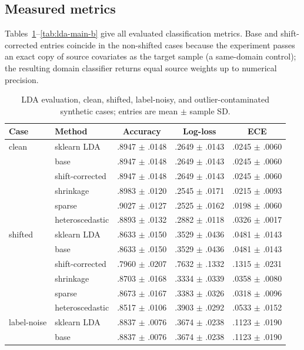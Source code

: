 \documentclass[conference]{IEEEtran}
\begin{document}
\subsection{Measured metrics}
Tables~\ref{tab:lda-main-a}--\ref{tab:lda-main-b} give all evaluated classification metrics. Base and shift-corrected entries coincide in the non-shifted cases because the experiment passes an exact copy of source covariates as the target sample (a same-domain control); the resulting domain classifier returns equal source weights up to numerical precision.
\begin{table}[t]
\centering\scriptsize
\setlength{\tabcolsep}{3pt}
\caption{LDA evaluation, clean, shifted, label-noisy, and outlier-contaminated synthetic cases; entries are mean $\pm$ sample SD.}
\label{tab:lda-main-a}
\begin{tabular}{llccc}
\toprule
Case & Method & Accuracy & Log-loss & ECE \\
\midrule
clean & sklearn LDA & .8947 $\pm$ .0148 & .2649 $\pm$ .0143 & .0245 $\pm$ .0060 \\
 & base & .8947 $\pm$ .0148 & .2649 $\pm$ .0143 & .0245 $\pm$ .0060 \\
 & shift-corrected & .8947 $\pm$ .0148 & .2649 $\pm$ .0143 & .0245 $\pm$ .0060 \\
 & shrinkage & .8983 $\pm$ .0120 & .2545 $\pm$ .0171 & .0215 $\pm$ .0093 \\
 & sparse & .9027 $\pm$ .0127 & .2525 $\pm$ .0162 & .0198 $\pm$ .0060 \\
 & heteroscedastic & .8893 $\pm$ .0132 & .2882 $\pm$ .0118 & .0326 $\pm$ .0017 \\
\midrule
shifted & sklearn LDA & .8633 $\pm$ .0150 & .3529 $\pm$ .0436 & .0481 $\pm$ .0143 \\
 & base & .8633 $\pm$ .0150 & .3529 $\pm$ .0436 & .0481 $\pm$ .0143 \\
 & shift-corrected & .7960 $\pm$ .0207 & .7632 $\pm$ .1332 & .1315 $\pm$ .0231 \\
 & shrinkage & .8703 $\pm$ .0168 & .3334 $\pm$ .0339 & .0358 $\pm$ .0080 \\
 & sparse & .8673 $\pm$ .0167 & .3383 $\pm$ .0326 & .0318 $\pm$ .0096 \\
 & heteroscedastic & .8517 $\pm$ .0106 & .3903 $\pm$ .0292 & .0533 $\pm$ .0152 \\
\midrule
label-noise & sklearn LDA & .8837 $\pm$ .0076 & .3674 $\pm$ .0238 & .1123 $\pm$ .0190 \\
 & base & .8837 $\pm$ .0076 & .3674 $\pm$ .0238 & .1123 $\pm$ .0190 \\

\end{tabular}
\end{table}
\end{document}
